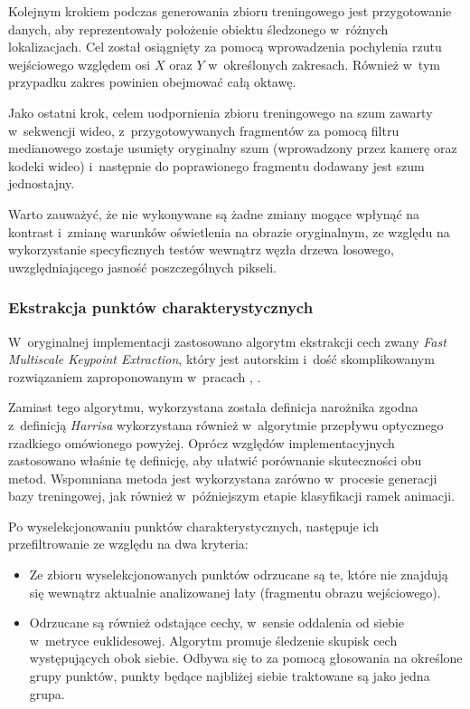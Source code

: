     Kolejnym krokiem podczas generowania zbioru treningowego jest przygotowanie danych, aby reprezentowały położenie obiektu śledzonego w~różnych lokalizacjach. Cel został osiągnięty za pomocą wprowadzenia pochylenia rzutu wejściowego względem osi $X$ oraz $Y$ w~określonych zakresach. Również w~tym przypadku zakres powinien obejmować całą oktawę.

    Jako ostatni krok, celem uodpornienia zbioru treningowego na szum zawarty w~sekwencji wideo, z~przygotowywanych fragmentów za pomocą filtru medianowego zostaje usunięty oryginalny szum (wprowadzony przez kamerę oraz kodeki wideo) i~następnie do poprawionego fragmentu dodawany jest szum jednostajny.

    Warto zauważyć, że nie wykonywane są żadne zmiany mogące wpłynąć na kontrast i~zmianę warunków oświetlenia na obrazie oryginalnym, ze względu na wykorzystanie specyficznych testów wewnątrz węzła drzewa losowego, uwzględniającego jasność poszczególnych pikseli.

    \subsubsection{Ekstrakcja punktów charakterystycznych}
    W~oryginalnej implementacji zastosowano algorytm ekstrakcji cech zwany \textit{Fast Multiscale Keypoint Extraction}, który jest autorskim i~dość skomplikowanym rozwiązaniem zaproponowanym w~pracach \cite{RealTimeRandomizedTrees05}, \cite{RandomizedTrees06}.

    Zamiast tego algorytmu, wykorzystana została definicja narożnika zgodna z~definicją \textit{Harrisa} wykorzystana również w~algorytmie przepływu optycznego rzadkiego omówionego powyżej. Oprócz względów implementacyjnych zastosowano właśnie tę definicję, aby ułatwić porównanie skuteczności obu metod. Wspomniana metoda jest wykorzystana zarówno w~procesie generacji bazy treningowej, jak również w~późniejszym etapie klasyfikacji ramek animacji.

    Po wyselekcjonowaniu punktów charakterystycznych, następuje ich przefiltrowanie ze względu na dwa kryteria:

    \begin{itemize}
      \item Ze zbioru wyselekcjonowanych punktów odrzucane są te, które nie znajdują się wewnątrz aktualnie analizowanej łaty (fragmentu obrazu wejściowego).
      \item Odrzucane są również odstające cechy, w~sensie oddalenia od siebie w~metryce euklidesowej. Algorytm promuje śledzenie skupisk cech występujących obok siebie. Odbywa się to za pomocą głosowania na określone grupy punktów, punkty będące najbliżej siebie traktowane są jako jedna grupa.
    \end{itemize}

